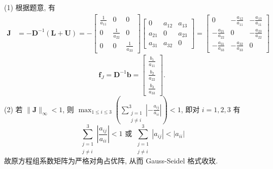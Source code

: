 \begin{tcolorbox}[enhanced,colback=10,colframe=9,breakable,coltitle=green!25!black,title=2024]
\tcblower
 (1) 根据题意, 有
$$
\begin{aligned}
\boldsymbol{J} & =-\boldsymbol{D}^{-1}(\boldsymbol{L}+\boldsymbol{U})=-\left[\begin{array}{ccc}
\frac{1}{a_{11}} & 0 & 0 \\
0 & \frac{1}{a_{22}} & 0 \\
0 & 0 & \frac{1}{a_{33}}
\end{array}\right]\left[\begin{array}{ccc}
0 & a_{12} & a_{13} \\
a_{21} & 0 & a_{23} \\
a_{31} & a_{32} & 0
\end{array}\right]  =\left[\begin{array}{ccc}
0 & -\frac{a_{12}}{a_{11}} & -\frac{a_{13}}{a_{11}} \\
-\frac{a_{21}}{a_{22}} & 0 & -\frac{a_{23}}{a_{22}} \\
-\frac{a_{31}}{a_{33}} & -\frac{a_{32}}{a_{33}} & 0
\end{array}\right]
\end{aligned}
$$
$$
\boldsymbol{f}_{J}=\boldsymbol{D}^{-1} \boldsymbol{b}=\left[\begin{array}{c}
\frac{b_{1}}{a_{11}} \\
\frac{b_{2}}{a_{22}} \\
\frac{b_{3}}{a_{33}}
\end{array}\right] .
$$
(2) 若 $ \|\boldsymbol{J}\|_{\infty}<1 $, 则 $\displaystyle \max _{1 \leqslant i \leqslant 3}\left(\sum_{\substack{j=1 \\ j \neq i}}^{3}\left|-\frac{a_{i j}}{a_{i i}}\right|\right)<1 $, 即对 $ i=1,2,3 $ 有
$$
\sum_{\substack{j=1 \\ j \neq i}}^{3}\left|\frac{a_{i j}}{a_{i i}}\right|<1 \text { 或 } \sum_{\substack{j=1 \\ j \neq i}}^{3}\left|a_{i j}\right|<\left|a_{i i}\right|
$$
故原方程组系数矩阵为严格对角占优阵, 从而 Gauss-Seidel 格式收玫.

 \end{tcolorbox}